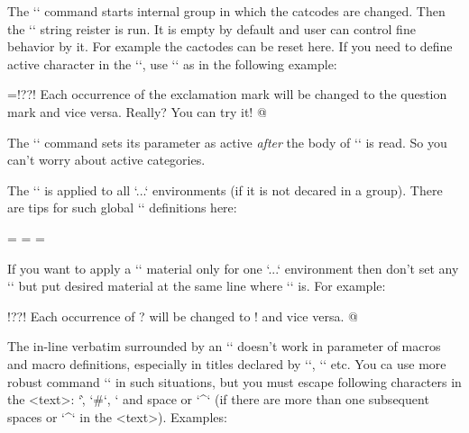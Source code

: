 The `\begtt` command starts internal group in which the catcodes are changed. 
\new
Then the `\tthook` string reister is run. It is empty by default and user can
control fine behavior by it. For example the cactodes can be reset here. If
you need to define active character in the `\tthook`, use `\adef` as in the
following example:

\begtt   \adef@{\string\endtt}
\tthook={\adef!{?}\adef?{!}}
\begtt
Each occurrence of the exclamation mark will be changed to 
the question mark and vice versa. Really? You can try it! 
@
\endtt

The `\adef` command sets its parameter as active {\it after\/}
the body of `\tthook` is read. So you can't worry about active
categories. 

The `\tthook` is applied to all `\begtt...\endtt` environments (if it is not
decared in a group). There are tips for such global `\tthook` definitions here:

\begtt
\tthook={\typosize[9/11]}      %
\tthook={}            %
\tthook={} %
\endtt

\new
If you want to apply a `\tthook` material only for one `\begtt...\endtt`
environment then don't set any `\tthook` but put desired material at the 
same line where `\begtt` is. For example:

\begtt   \adef@{\string\endtt}
\begtt   \adef!{?}\adef?{!}
Each occurrence of ? will be changed to ! and vice versa. 
@
\endtt

The in-line verbatim surrounded by an `\activettchar` doesn't work in
parameter of macros and macro definitions, especially in titles declared by
`\chap`, `\sec` etc. 
\new
You ca use more robust command `` in such
situations, but you must escape following characters in the <text>:
`\`, `#`, `%
and space or `^` (if there are more than one subsequent spaces or `^` in 
the <text>). Examples:

